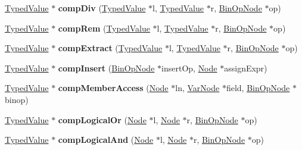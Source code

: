 \begin{DoxyCompactItemize}
\hyperlink{structTypedValue}{Typed\+Value} $\ast$ {\bfseries comp\+Div} (\hyperlink{structTypedValue}{Typed\+Value} $\ast$l, \hyperlink{structTypedValue}{Typed\+Value} $\ast$r, \hyperlink{structBinOpNode}{Bin\+Op\+Node} $\ast$op)
\item 
\mbox{\label{structante_1_1Compiler_a19cc67657d5364d89f54bd43d8c3ea72}} 
\hyperlink{structTypedValue}{Typed\+Value} $\ast$ {\bfseries comp\+Rem} (\hyperlink{structTypedValue}{Typed\+Value} $\ast$l, \hyperlink{structTypedValue}{Typed\+Value} $\ast$r, \hyperlink{structBinOpNode}{Bin\+Op\+Node} $\ast$op)
\item 
\mbox{\label{structante_1_1Compiler_a8241d710e304da8f65421a72dd55a7b4}} 
\hyperlink{structTypedValue}{Typed\+Value} $\ast$ {\bfseries comp\+Extract} (\hyperlink{structTypedValue}{Typed\+Value} $\ast$l, \hyperlink{structTypedValue}{Typed\+Value} $\ast$r, \hyperlink{structBinOpNode}{Bin\+Op\+Node} $\ast$op)
\item 
\mbox{\label{structante_1_1Compiler_a056035aaaa62a7017868e3cb5d6d17a2}} 
\hyperlink{structTypedValue}{Typed\+Value} $\ast$ {\bfseries comp\+Insert} (\hyperlink{structBinOpNode}{Bin\+Op\+Node} $\ast$insert\+Op, \hyperlink{structNode}{Node} $\ast$assign\+Expr)
\item 
\mbox{\label{structante_1_1Compiler_ac229b1748ccbee2a9fbb40a993ce8142}} 
\hyperlink{structTypedValue}{Typed\+Value} $\ast$ {\bfseries comp\+Member\+Access} (\hyperlink{structNode}{Node} $\ast$ln, \hyperlink{structVarNode}{Var\+Node} $\ast$field, \hyperlink{structBinOpNode}{Bin\+Op\+Node} $\ast$binop)
\item 
\mbox{\label{structante_1_1Compiler_a8f811023f4c536be22e328337fdc037d}} 
\hyperlink{structTypedValue}{Typed\+Value} $\ast$ {\bfseries comp\+Logical\+Or} (\hyperlink{structNode}{Node} $\ast$l, \hyperlink{structNode}{Node} $\ast$r, \hyperlink{structBinOpNode}{Bin\+Op\+Node} $\ast$op)
\item 
\mbox{\label{structante_1_1Compiler_a878a402f38a90c24d8e906808c00ac0f}} 
\hyperlink{structTypedValue}{Typed\+Value} $\ast$ {\bfseries comp\+Logical\+And} (\hyperlink{structNode}{Node} $\ast$l, \hyperlink{structNode}{Node} $\ast$r, \hyperlink{structBinOpNode}{Bin\+Op\+Node} $\ast$op)

\end{DoxyCompactItemize}
